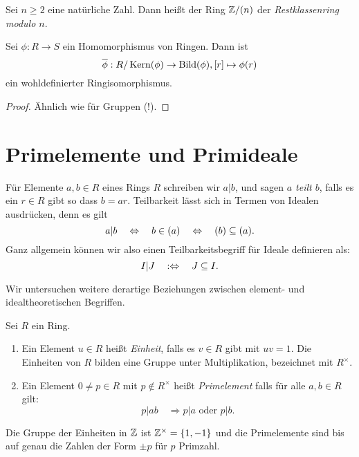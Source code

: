 \documentclass{book}
\begin{document}
\begin{exa}
    \label{exa:restklassen}
    Sei $n \ge 2$ eine natürliche Zahl. Dann heißt der Ring $\mathbb{Z}/(n)$ der
    \emph{Restklassenring modulo $n$}.
\end{exa}


\begin{thm}
    \label{thm:haupthom}
    Sei $\phi: R \to S$ ein Homomorphismus von Ringen. Dann ist 
    \[
        \overline{\phi}: R/\Kern(\phi) \to \Bild(\phi), [r] \mapsto \phi(r)
    \]
    ein wohldefinierter Ringisomorphismus.
\end{thm}
\begin{proof}
    Ähnlich wie für Gruppen (!).
\end{proof}

\section{Primelemente und Primideale}%
\label{sec:primideale}

Für Elemente $a,b \in R$ eines Rings $R$ schreiben wir $a|b$, und sagen {\em
$a$ teilt $b$}, falls es ein $r \in R$ gibt so dass $b = a r$. Teilbarkeit
lässt sich in Termen von Idealen ausdrücken, denn es gilt
\[
    a | b \quad \Leftrightarrow \quad b \in (a) \quad \Leftrightarrow \quad (b) \subseteq (a).
\]
Ganz allgemein können wir also einen Teilbarkeitsbegriff für Ideale definieren als:
\[
    I | J \quad : \Leftrightarrow \quad J \subseteq I.
\]

Wir untersuchen weitere derartige Beziehungen zwischen element- und idealtheoretischen
Begriffen.

\begin{term}
    \label{term:einheitprim}
    Sei $R$ ein Ring. 
    \begin{enumerate}
        \item Ein Element $u \in R$ heißt \emph{Einheit}, falls es $v \in R$
            gibt mit $uv =1$. Die Einheiten von $R$ bilden eine Gruppe unter
            Multiplikation, bezeichnet mit $R^{\times}$. 
        \item Ein Element $0 \neq p \in R$ mit $p \notin R^{\times}$ heißt
            \emph{Primelement} falls für alle $a,b \in R$ gilt: 
            \[
                p|ab \quad \Rightarrow \text{$p|a$ oder $p|b$}. 
            \]
    \end{enumerate}
\end{term}

\begin{exa}
        Die Gruppe der Einheiten in $\mathbb{Z}$ ist $\mathbb{Z}^{\times} = \{1, -1 \}$ und
        die Primelemente sind bis auf genau die Zahlen der Form $\pm p$ für $p$
        Primzahl.
\end{exa}
\end{document}
